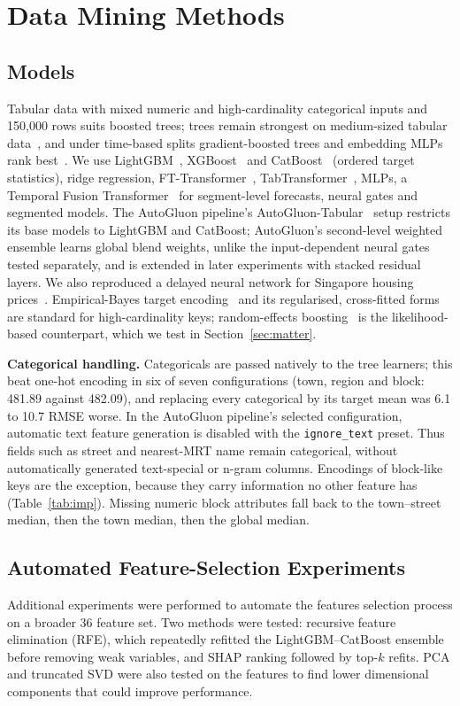 \documentclass[conference]{IEEEtran}
\newif\ifshowsrc
\newcommand{\src}[1]{\ifshowsrc\textsuperscript{\tiny\color{gray}[#1]}\fi}
\begin{document}
\section{Data Mining Methods}
\subsection{Models}
Tabular data with mixed numeric and high-cardinality categorical inputs and 150,000 rows suits boosted trees; trees remain strongest on medium-sized tabular data~\cite{grinsztajn}, and under time-based splits gradient-boosted trees and embedding MLPs rank best~\cite{tabred}. We use LightGBM~\cite{lightgbm}, XGBoost~\cite{xgboost} and CatBoost~\cite{catboost} (ordered target statistics), ridge regression, FT-Transformer~\cite{ftt}, TabTransformer~\cite{tabt}, MLPs, a Temporal Fusion Transformer~\cite{tft} for segment-level forecasts, neural gates and segmented models. The AutoGluon pipeline's AutoGluon-Tabular~\cite{autogluon} setup restricts its base models to LightGBM and CatBoost; AutoGluon's second-level weighted ensemble learns global blend weights, unlike the input-dependent neural gates tested separately, and is extended in later experiments with stacked residual layers. We also reproduced a delayed neural network for Singapore housing prices~\cite{wang2016}.\src{Me-families,Be-paper} Empirical-Bayes target encoding~\cite{micci} and its regularised, cross-fitted forms~\cite{pargent} are standard for high-cardinality keys; random-effects boosting~\cite{gpboost} is the likelihood-based counterpart, which we test in Section~\ref{sec:matter}.

\textbf{Categorical handling.} Categoricals are passed natively to the tree learners; this beat one-hot encoding in six of seven configurations (town, region and block: 481.89 against 482.09),\src{Me-onehot} and replacing every categorical by its target mean was 6.1 to 10.7 RMSE worse.\src{Me-te-all} In the AutoGluon pipeline's selected configuration, automatic text feature generation is disabled with the \texttt{ignore\_text} preset. Thus fields such as street and nearest-MRT name remain categorical, without automatically generated text-special or n-gram columns.\src{Me-text} Encodings of block-like keys are the exception, because they carry information no other feature has (Table~\ref{tab:imp}). Missing numeric block attributes fall back to the town--street median, then the town median, then the global median.\src{Me-fallback}

\subsection{Automated Feature-Selection Experiments}
Additional experiments were performed to automate the features selection process on a broader 36 feature set. 
Two methods were tested: recursive feature elimination (RFE), 
which repeatedly refitted the LightGBM--CatBoost ensemble before removing weak variables, and SHAP ranking followed by top-$k$ refits. 
 PCA and truncated SVD were also tested on the features to find lower dimensional components that could improve performance.\src{Me-fs-manual,Me-fs-auto,Me-dim}
\end{document}
